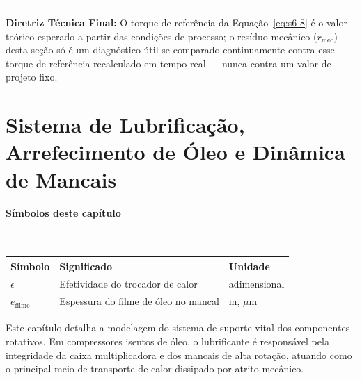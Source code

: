 \documentclass[12pt,a4paper]{article}
\numberwithin{equation}{section}
\numberwithin{table}{section}
\numberwithin{figure}{section}
\begin{document}
	\vspace{1em}
	\hrule
	\vspace{1em}

	\textbf{Diretriz Técnica Final:} O torque de referência da Equação~\eqref{eq:s6-8} é o valor teórico esperado a partir das condições de processo; o resíduo mecânico ($r_{\text{mec}}$) desta seção só é um diagnóstico útil se comparado continuamente contra esse torque de referência recalculado em tempo real — nunca contra um valor de projeto fixo.

	
	
	\clearpage
	\section{\textbf{Sistema de Lubrificação, Arrefecimento de Óleo e Dinâmica de Mancais}}

\paragraph{Símbolos deste capítulo}\mbox{}\\[-0.5em]
{\small
\begin{longtable}{>{\raggedright\arraybackslash}p{2.6cm} >{\raggedright\arraybackslash}p{9.2cm} >{\raggedright\arraybackslash}p{2.6cm}}
	\toprule
	\textbf{Símbolo} & \textbf{Significado} & \textbf{Unidade} \\ \midrule
	\endhead
	$\epsilon$ & Efetividade do trocador de calor & adimensional \\
	$e_{\text{filme}}$\dag & Espessura do filme de óleo no mancal & m, $\mu$m \\
	\bottomrule
\end{longtable}
}




	
	Este capítulo detalha a modelagem do sistema de suporte vital dos componentes rotativos. Em compressores isentos de óleo, o lubrificante é responsável pela integridade da caixa multiplicadora e dos mancais de alta rotação, atuando como o principal meio de transporte de calor dissipado por atrito mecânico.
	
\end{document}
